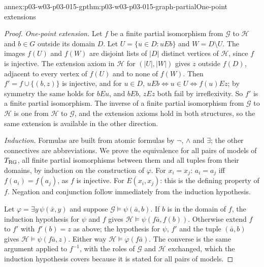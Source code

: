 \begin{annexitem}{annex:p03-w03-p03-015-gp}{thm:p03-w03-p03-015-graph-partial}{One-point extensions}
\begin{proof}
\emph{One-point extension.} Let \(f\) be a finite partial isomorphism from
\(\mathcal G\) to \(\mathcal H\) and \(b\in G\) outside its domain
\(D\). Let \(U=\{u\in D:uEb\}\) and \(W=D\setminus U\). The images
\(f(U)\) and \(f(W)\) are disjoint lists of \(|D|\) distinct vertices of
\(\mathcal H\), since \(f\) is injective. The extension axiom in
\(\mathcal H\) for \((|U|,|W|)\) gives \(z\) outside \(f(D)\), adjacent to
every vertex of \(f(U)\) and to none of \(f(W)\). Then
\(f'=f\cup\{(b,z)\}\) is injective, and for \(u\in D\),
\(uEb\Leftrightarrow u\in U\Leftrightarrow f(u)Ez\); by symmetry the same
holds for \(bEu\), and \(bEb\), \(zEz\) both fail by irreflexivity. So
\(f'\) is a finite partial isomorphism. The inverse of a finite partial
isomorphism from \(\mathcal G\) to \(\mathcal H\) is one from
\(\mathcal H\) to \(\mathcal G\), and the extension axioms hold in both
structures, so the same extension is available in the other direction.

\emph{Induction.} Formulas are built from atomic formulas by \(\neg\),
\(\land\) and \(\exists\); the other connectives are abbreviations. We prove
the equivalence for all pairs of models of \(T_{\rm RG}\), all finite
partial isomorphisms between them and all tuples from their domains, by
induction on the construction of \(\varphi\).
For \(x_i=x_j\): \(a_i=a_j\) iff \(f(a_i)=f(a_j)\), as \(f\) is injective.
For \(E(x_i,x_j)\): this is the defining property of \(f\).
Negation and conjunction follow immediately from the induction hypothesis.

Let \(\varphi=\exists y\,\psi(\bar x,y)\) and suppose
\(\mathcal G\models\psi(\bar a,b)\). If \(b\) is in the domain of \(f\),
the induction hypothesis for \(\psi\) and \(f\) gives
\(\mathcal H\models\psi(f\bar a,f(b))\). Otherwise extend \(f\) to \(f'\)
with \(f'(b)=z\) as above; the hypothesis for \(\psi\), \(f'\) and the
tuple \((\bar a,b)\) gives \(\mathcal H\models\psi(f\bar a,z)\). Either
way \(\mathcal H\models\varphi(f\bar a)\). The converse is the same
argument applied to \(f^{-1}\), with the roles of \(\mathcal G\) and
\(\mathcal H\) exchanged, which the induction hypothesis covers because it
is stated for all pairs of models.
\end{proof}
\end{annexitem}

